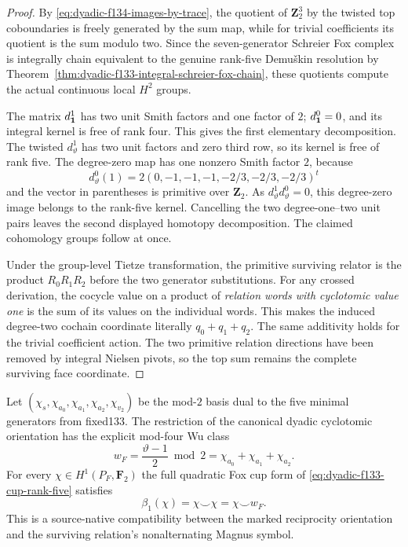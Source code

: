 \begin{proof}
By
\eqref{eq:dyadic-f134-images-by-trace},
the quotient of
$\mathbf Z_2^3$
by the twisted
top coboundaries
is freely generated
by the sum map,
while for trivial
coefficients its
quotient is the
sum modulo two.
Since the
seven-generator
Schreier Fox
complex is
integrally chain
equivalent to the
genuine rank-five
Demu\v{s}kin
resolution by
Theorem~\ref{thm:dyadic-f133-integral-schreier-fox-chain},
these quotients
compute the actual
continuous local
$H^2$ groups.

The matrix
$d_{\bf1}^1$
has two unit
Smith factors
and one factor
of $2$;
$d_{\bf1}^0=0$,
and its integral
kernel is
free of rank four.
This gives the
first elementary
decomposition.
The twisted
$d_\vartheta^1$
has two unit
factors and
zero third row,
so its kernel
is free of rank five.
The degree-zero
map has one
nonzero Smith
factor $2$,
because
\[
d_\vartheta^0(1)
=2(0,-1,-1,-1,-2/3,-2/3,-2/3)^t
\]
and the vector
in parentheses
is primitive
over $\mathbf Z_2$.
As $d_\vartheta^1
d_\vartheta^0=0$,
this degree-zero
image belongs
to the rank-five
kernel.
Cancelling the
two degree-one--two
unit pairs leaves
the second
displayed
homotopy decomposition.
The claimed
cohomology groups
follow at once.

Under the
group-level
Tietze transformation,
the primitive
surviving relator
is the product
$R_0R_1R_2$
before the two
generator substitutions.
For any crossed
derivation, the
cocycle value
on a product
of \emph{relation
words with
cyclotomic value one}
is the sum of
its values on the
individual words.
This makes the
induced degree-two
cochain coordinate
literally
$q_0+q_1+q_2$.
The same
additivity holds
for the trivial
coefficient action.
The two primitive
relation directions
have been
removed by
integral Nielsen
pivots, so the
top sum remains
the complete
surviving face
coordinate.
\end{proof}

\begin{corollary}
\label{cor:dyadic-f134-marked-wu}
Let
$(\chi_s,\chi_{a_0},
\chi_{a_1},\chi_{a_2},
\chi_{v_2})$
be the mod-$2$
basis dual to
the five
minimal generators
from fixed133.
The restriction of
the canonical
dyadic cyclotomic
orientation
has the explicit
mod-four Wu class
\begin{equation}\label{eq:dyadic-f134-marked-wu-class}
\boxed{\qquad
w_F=
\frac{\vartheta-1}{2}\bmod2
=\chi_{a_0}+
\chi_{a_1}+\chi_{a_2}.
\qquad}
\end{equation}
For every
$\chi\in H^1(P_F,\mathbf F_2)$
the full quadratic
Fox cup form of
\eqref{eq:dyadic-f133-cup-rank-five}
satisfies
\begin{equation}\label{eq:dyadic-f134-fox-wu-compatibility}
\boxed{\qquad
\beta_1(\chi)=
\chi\smile\chi=
\chi\smile w_F.
\qquad}
\end{equation}
This is a
source-native
compatibility
between the
marked reciprocity
orientation and
the surviving
relation's
nonalternating
Magnus symbol.
\end{corollary}

